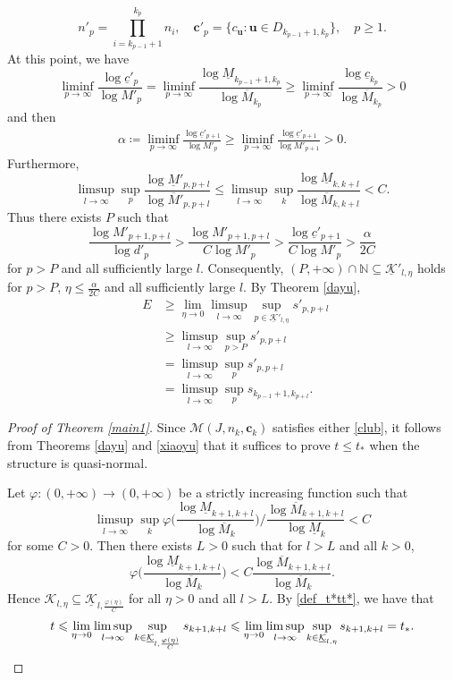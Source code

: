 \documentclass[12pt]{amsart}
\numberwithin{equation}{section}
\theoremstyle{plain}
\theoremstyle{remark}
\theoremstyle{definition}
\newcommand{\kk}{\mathcal{K}}
\newcommand{\uk}{\underline{\mathcal{K}}}
\newcommand{\om}{\overline{M}}
\newcommand{\um}{\underline{M}}
\newcommand{\N}{\mathbb{N}}
\newcommand{\bu}{\mathbf{u}}
\newcommand{\ccc}{\mathbf{c}}
\newcommand{\f}{\frac}
\newcommand{\uc}{\underline{c}}
\renewcommand{\ge}{\geqslant}
\renewcommand{\le}{\leqslant}
\DeclareMathOperator{\dimqa}{dim_{qA}}
\begin{document}
	\[
	n'_p=\prod_{i=k_{p-1}+1}^{k_p} n_i,\quad \ccc'_p=\{c_\bu:\bu\in D_{k_{p-1}+1,k_p}\},\quad p\ge 1.
	\]
	At this point, we have
	\[
	\liminf_{p\to\infty}\f{\log{\uc'_p}}{\log M'_p}=\liminf_{p\to\infty}\f{\log \um_{k_{p-1}+1,k_p}}{\log \om_{k_p}}\ge \liminf_{p\to\infty}\f{\log \uc_{k_p}}{\log \om_{k_p}}>0
	\]
	and then
	\begin{align*}
		\alpha\coloneq\liminf_{p\to\infty}\f{\log{\uc'_{p+1}}}{\log M'_p}\ge \liminf_{p\to\infty}\f{\log{\uc'_{p+1}}}{\log M'_{p+1}}>0.
	\end{align*}
	Furthermore,
	\[
	\limsup_{l\to\infty}\sup_p\f{\log \um'_{p,p+l}}{\log \om'_{p,p+l}}\le \limsup_{l\to\infty}\sup_k\f{\log \um_{k,k+l}}{\log \om_{k,k+l}}<C.
	\]
	Thus there exists $P$ such that
	\[
	\f{\log M'_{p+1,p+l}}{\log d'_p}>\f{\log M'_{p+1,p+l}}{C\log M'_p}>\f{\log \uc'_{p+1}}{C\log M'_p}>\f{\alpha}{2C}
	\]
	for $p>P$ and all sufficiently large $l$. Consequently, $(P,+\infty)\cap \N\subseteq \uk'_{l,\eta}$ holds for $p>P,\,\eta\le\f{\alpha}{2C} $ and all sufficiently large $l$. By Theorem \ref{dayu}, 
	\begin{align*}
		\dimqa E&\ge \lim_{\eta\to 0}\limsup_{l\to\infty}\sup_{p\in \uk'_{l,\eta}} s'_{p,p+l}\\
		&\ge \limsup_{l\to\infty}\sup_{p>P} s'_{p,p+l}\\
		&= \limsup_{l\to\infty}\sup_{p} s'_{p,p+l}\\
		&=\limsup_{l\to\infty}\sup_{p} s_{k_{p-1}+1,k_{p+l}}.
	\end{align*}
	\fi
	
	
	\begin{proof}[Proof of Theorem \ref{main1}]
		Since $\mathcal{M}(J,{n_k},{\ccc_k})$ satisfies either \eqref{club}, it follows from Theorems \ref{dayu} and \ref{xiaoyu} that it suffices to prove $t\le t_*$ when the structure is quasi-normal.
		
		Let  $\varphi:(0,+\infty)\to (0,+\infty)$ be a strictly increasing function such that 
		\[
		\limsup_{l\to \infty}\sup_k \varphi\Big(\frac{\log \um_{k+1,k+l}}{\log \om_{k}}\Big)\Big/\frac{\log \om_{k+1,k+l}}{\log \um_{k}}<C
		\]
		for  some $C>0$. Then  there exists $L>0$ such that  for $l>L$ and all $k>0$, 
		\[
		\varphi\Big(\frac{\log \um_{k+1,k+l}}{\log \om_{k}}\Big)<C\frac{\log \om_{k+1,k+l}}{\log \om_{k}}.
		\]
		Hence  
		$\kk_{l,\eta}\subseteq \uk_{l,\frac{\varphi(\eta)}C}$ for all $\eta>0$ and  all $l>L$. By \eqref{def_t*tt*}, we have that 
		\begin{equation*}
			\begin{aligned}
				t \le \lim_{\eta\to 0}\limsup_{l\to\infty}\sup_{k\in \uk_{l,\frac{\varphi(\eta)}C}} s_{k+1,k+l} \le\lim_{\eta\to 0}\limsup_{l\to\infty}\sup_{k\in \uk_{l,\eta}} s_{k+1,k+l} =t_*.
			\end{aligned}\qedhere
		\end{equation*}
		
	\end{proof}
\end{document}
